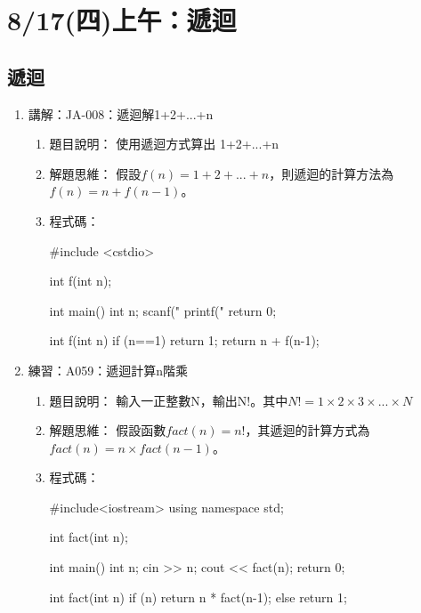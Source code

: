 
\section{8/17(四)上午：遞迴}

\subsection{遞迴}
\begin{enumerate}
	\item 講解：JA-008：遞迴解1+2+...+n
		\begin{enumerate}
			\item 題目說明：
			\subitem 使用遞迴方式算出 1+2+...+n
			
			\item 解題思維：
			\subitem 假設$f(n)=1+2+...+n$，則遞迴的計算方法為$f(n)=n+f(n-1)$。
			
			\item 程式碼：
			\begin{cppcode}
				#include <cstdio>
				
				int f(int n);
				
				int main()
				{
					int n;
					scanf("%
					printf("%
					return 0;
				}
				
				int f(int n)
				{
					if (n==1) return 1;
					return n + f(n-1);
				}
								
			\end{cppcode}
		\end{enumerate}
	
	\item 練習：A059：遞迴計算n階乘
		\begin{enumerate}
			\item 題目說明：
			\subitem 輸入一正整數N，輸出N!。其中$N! = 1\times2\times3\times...\times N$
			
			\item 解題思維：
			\subitem 假設函數$fact(n)=n! $，其遞迴的計算方式為$fact(n)=n\times fact(n-1)$。
			
			\item 程式碼：
			\begin{cppcode}
				#include<iostream>
				using namespace std;
				
				int fact(int n);

				int main()
				{
					int n;
					cin >> n;
					cout << fact(n);
					return 0;
				}

				int fact(int n)
				{
					if (n) return n * fact(n-1);
					else return 1;
				}


\end{cppcode}
\end{enumerate}
\end{enumerate}
